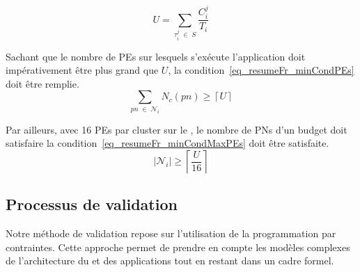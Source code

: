 \documentclass[main.tex]{subfiles}
\begin{document}
\begin{description}
\begin{displaymath}
    U = \underset{\tau_i^j \; \in \; S}{\sum} \dfrac{C_i^j}{T_i}
\end{displaymath}

        Sachant que le nombre de PEs sur lesquels s'exécute l'application doit impérativement être plus grand que $U$, la condition~\ref{eq_resumeFr_minCondPEs} doit être remplie.
\begin{equation}
    \underset{pn \; \in \; \mathcal{N}_i}{\sum} N_c(pn) \geq \left\lceil U \right\rceil
    \label{eq_resumeFr_minCondPEs}
\end{equation}

        Par ailleurs, avec 16 PEs par cluster sur le \mppalong, le nombre de PNs d'un budget doit satisfaire la condition~\ref{eq_resumeFr_minCondMaxPEs} doit être satisfaite.
\begin{equation}
    | \mathcal{N}_i | \geq \left\lceil \dfrac{U}{16} \right\rceil
    \label{eq_resumeFr_minCondMaxPEs}
\end{equation}

\end{description}

\subsection{Processus de validation}
Notre méthode de validation repose sur l'utilisation de la programmation par contraintes. Cette approche permet de prendre en compte les modèles complexes de l'architecture du \mppalong et des applications tout en restant dans un cadre formel.
\end{document}
